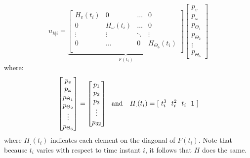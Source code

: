 \begin{equation}
{u}_{k|i}=\underbrace{\left[ \begin{matrix}
H_v(t_i)          & 0 & \dots      & 0  \\
0 &     H_\omega(t_i)      & \dots      & 0  \\
\vdots     & \vdots     & \ddots     & \vdots      \\
0 & \dots      & 0 &   H_{\Theta_6}(t_i)         \\
\end{matrix} \right]}_{F(t_i)} \left[ \begin{matrix} p_v \\ p_{\omega} \\ p_{\Theta_1} \\ p_{\Theta_2} \\ \vdots \\ p_{\Theta_6} \end{matrix} \right]
\end{equation}
where: 
\begin{equation}
\left[ \begin{matrix} p_v \\ p_{\omega} \\ {p}_{\Theta_1} \\ {p}_{\Theta_2} \\ \vdots \\ {p}_{\Theta_6} \end{matrix} \right] = \left[ \begin{matrix} p_1 \\ p_2 \\ p_3 \\ \vdots \\ p_{32} \end{matrix} \right]\ \ \textnormal{and }\ \ H_.(t_i)=[\ t_i^3\ \ t_i^2\ \ t_i\ \ 1\ ]
\end{equation}
where $H_.(t_i)$ indicates each element on the diagonal of $F(t_i)$.
Note that because $t_i$ varies with respect to time instant $i$, it follows that $H$ does the same. 

